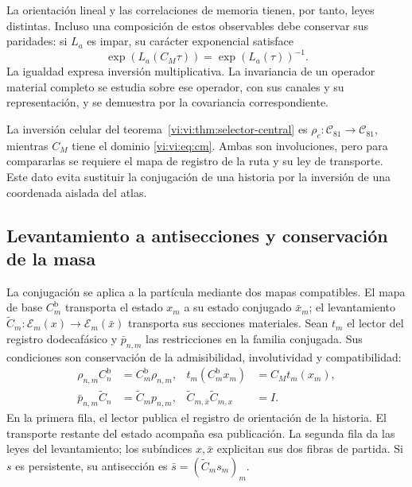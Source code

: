 La orientación lineal y las correlaciones de memoria tienen, por tanto,
leyes distintas. Incluso una composición de estos observables debe
conservar sus paridades: si $L_a$ es impar, su carácter exponencial
satisface
\begin{equation}
 \exp(L_a(C_M\tau))=\exp(L_a(\tau))^{-1}.
 \label{vi:vi:eq:caracter-inverso}
\end{equation}
La igualdad expresa inversión multiplicativa. La invariancia de un
operador material completo se estudia sobre ese operador, con sus
canales y su representación, y se demuestra por la covariancia
correspondiente.

La inversión celular del teorema~\ref{vi:vi:thm:selector-central} es
$\rho_c:\mathcal C_{81}\to\mathcal C_{81}$, mientras $C_M$ tiene
el dominio \eqref{vi:vi:eq:cm}. Ambas son involuciones, pero para
compararlas se requiere el mapa de registro de la ruta y su ley de
transporte. Este dato evita sustituir la conjugación de una historia
por la inversión de una coordenada aislada del atlas.

\subsection{Levantamiento a antisecciones y conservación de la masa}
\label{vi:vi:subsec:antisecciones}

La conjugación se aplica a la partícula mediante dos mapas
compatibles. El mapa de base $C_m^{\mathrm b}$ transporta el estado
$x_m$ a su estado conjugado $\bar x_m$; el levantamiento
$\widetilde C_m:\mathscr E_m(x)\to\mathscr E_m(\bar x)$
transporta sus secciones materiales. Sean $t_m$ el lector del
registro dodecafásico y $\bar p_{n,m}$ las restricciones en la
familia conjugada. Sus condiciones son conservación de la
admisibilidad, involutividad y compatibilidad:
\begin{equation}
 \begin{aligned}
 \rho_{n,m}C_n^{\mathrm b}&=C_m^{\mathrm b}\rho_{n,m},
 &t_m(C_m^{\mathrm b}x_m)&=C_Mt_m(x_m),\\
 \bar p_{n,m}\widetilde C_n&=\widetilde C_mp_{n,m},
 &\widetilde C_{m,\bar x}\widetilde C_{m,x}&=I.
 \end{aligned}
 \label{vi:vi:eq:levantamiento-cm}
\end{equation}
En la primera fila, el lector publica el registro de orientación
de la historia. El transporte restante del estado acompaña esa
publicación. La segunda fila da las leyes del levantamiento;
los subíndices $x,\bar x$ explicitan sus dos fibras de partida.
Si $s$ es persistente, su antisección es
$\bar s=(\widetilde C_ms_m)_m$.

